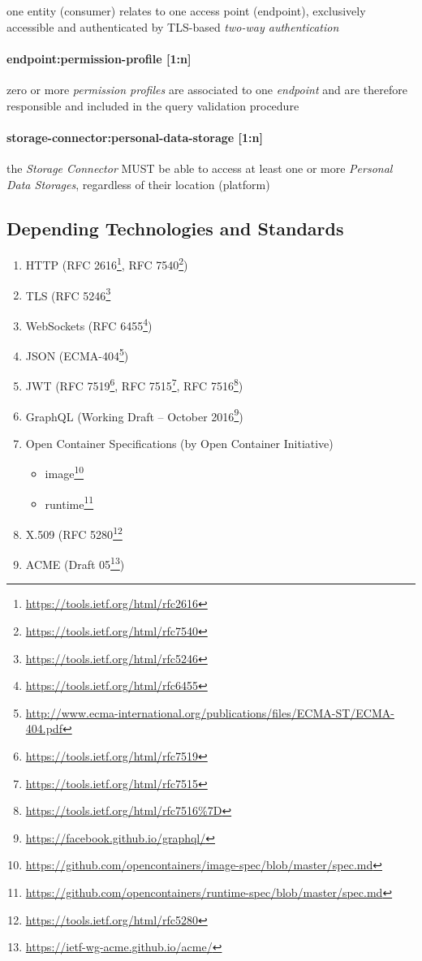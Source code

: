 \documentclass[12pt,english,a4paper,titlepage,cleardoublepage=empty,dottedtoc]{report}
\renewcommand{\href}[2]{#2\footnote{\url{#1}}}
\providecommand{\tightlist}{%
  \setlength{\itemsep}{0pt}\setlength{\parskip}{0pt}}
\begin{document}
one entity (consumer) relates to one access point (endpoint),
exclusively accessible and authenticated by TLS-based \emph{two-way
authentication}

\paragraph{endpoint:permission-profile
{[}1:n{]}}\label{endpointpermission-profile-1n}

zero or more \emph{permission profiles} are associated to one
\emph{endpoint} and are therefore responsible and included in the query
validation procedure

\paragraph{storage-connector:personal-data-storage
{[}1:n{]}}\label{storage-connectorpersonal-data-storage-1n}

the \emph{Storage Connector} MUST be able to access at least one or more
\emph{Personal Data Storages}, regardless of their location (platform)

\subsection{Depending Technologies and
Standards}\label{depending-technologies-and-standards}

\begin{enumerate}
\def\labelenumi{\alph{enumi})}
\tightlist
\item
  HTTP (\href{https://tools.ietf.org/html/rfc2616}{RFC 2616},
  \href{https://tools.ietf.org/html/rfc7540}{RFC 7540})
\item
  TLS (\href{https://tools.ietf.org/html/rfc5246}{RFC 5246}
\item
  WebSockets (\href{https://tools.ietf.org/html/rfc6455}{RFC 6455})
\item
  JSON
  (\href{http://www.ecma-international.org/publications/files/ECMA-ST/ECMA-404.pdf}{ECMA-404})
\item
  JWT (\href{https://tools.ietf.org/html/rfc7519}{RFC 7519},
  \href{https://tools.ietf.org/html/rfc7515}{RFC 7515},
  \href{https://tools.ietf.org/html/rfc7516\%7D}{RFC 7516})
\item
  GraphQL (\href{https://facebook.github.io/graphql/}{Working Draft --
  October 2016})
\item
  Open Container Specifications (by Open Container Initiative)

  \begin{itemize}
  \tightlist
  \item
    \href{https://github.com/opencontainers/image-spec/blob/master/spec.md}{image}
  \item
    \href{https://github.com/opencontainers/runtime-spec/blob/master/spec.md}{runtime}
  \end{itemize}
\item
  X.509 (\href{https://tools.ietf.org/html/rfc5280}{RFC 5280}
\item
  ACME (\href{https://ietf-wg-acme.github.io/acme/}{Draft 05})
\end{enumerate}
\end{document}
